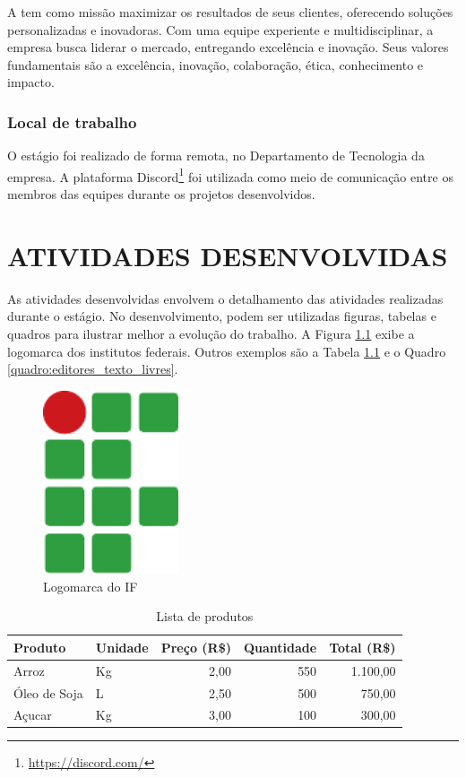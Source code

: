 \documentclass[estagio]{iftex2024}
\begin{document}
A {\theEmpresa} tem como missão maximizar os resultados de seus clientes, oferecendo soluções personalizadas e inovadoras.
Com uma equipe experiente e multidisciplinar, a empresa busca liderar o mercado, entregando excelência e inovação.
Seus valores fundamentais são a excelência, inovação, colaboração, ética, conhecimento e impacto.

\subsection{Local de trabalho}

O estágio foi realizado de forma remota, no Departamento de Tecnologia da empresa.
A plataforma Discord\footnote{\url{https://discord.com/}} foi utilizada como meio de comunicação entre os membros das equipes durante os projetos desenvolvidos.

\chapter{ATIVIDADES DESENVOLVIDAS}

As atividades desenvolvidas envolvem o detalhamento das atividades realizadas durante o estágio.
No desenvolvimento, podem ser utilizadas figuras, tabelas e quadros para ilustrar melhor a evolução do trabalho.
A Figura \ref{figura:logomarca_if} exibe a logomarca dos institutos federais.
Outros exemplos são a Tabela \ref{tabela:lista_produtos} e o Quadro \ref{quadro:editores_texto_livres}.

\begin{figure}[!htb] \centering
  \caption{Logomarca do IF} \label{figura:logomarca_if}
  \begin{varwidth}{\linewidth}
    \includegraphics[width=4cm]{figuras/if}
  \end{varwidth}
\end{figure}

\begin{table}[!htb]
\caption{Lista de produtos} \label{tabela:lista_produtos}
\begin{tabularx}{\textwidth}{X|l|r|r|r} \hline
Produto      & Unidade & Preço (R\$) & Quantidade & Total (R\$) \\ \hline
Arroz        & Kg      & 2,00        & 550        & 1.100,00    \\
Óleo de Soja & L       & 2,50        & 500        & 750,00      \\
Açucar       & Kg      & 3,00        & 100        & 300,00      \\ \hline
\end{tabularx}
\end{table}
\end{document}
